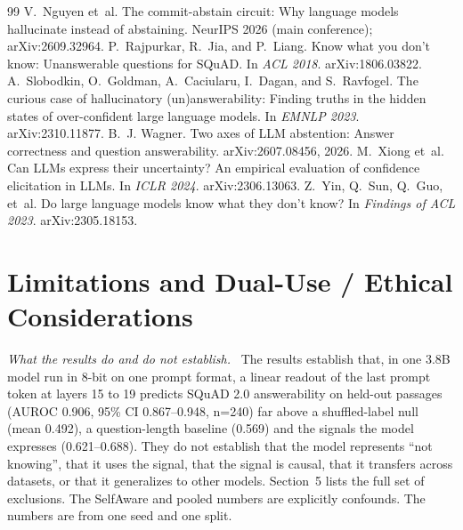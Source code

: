 \documentclass[10pt]{article}
\renewcommand{\paragraph}[1]{\par\vspace{0.3em}\noindent\textit{#1}\ }
\begin{document}
\begin{thebibliography}{99}
 V.~Nguyen et~al. The commit-abstain circuit: Why language models hallucinate instead of abstaining. NeurIPS 2026 (main conference); arXiv:2609.32964.
 P.~Rajpurkar, R.~Jia, and P.~Liang. Know what you don't know: Unanswerable questions for SQuAD. In \emph{ACL 2018}. arXiv:1806.03822.
 A.~Slobodkin, O.~Goldman, A.~Caciularu, I.~Dagan, and S.~Ravfogel. The curious case of hallucinatory (un)answerability: Finding truths in the hidden states of over-confident large language models. In \emph{EMNLP 2023}. arXiv:2310.11877.
 B.~J. Wagner. Two axes of LLM abstention: Answer correctness and question answerability. arXiv:2607.08456, 2026.
 M.~Xiong et~al. Can LLMs express their uncertainty? An empirical evaluation of confidence elicitation in LLMs. In \emph{ICLR 2024}. arXiv:2306.13063.
 Z.~Yin, Q.~Sun, Q.~Guo, et~al. Do large language models know what they don't know? In \emph{Findings of ACL 2023}. arXiv:2305.18153.
\end{thebibliography}

\clearpage
\appendix
\section{Limitations and Dual-Use / Ethical Considerations}\label{app:ethics}
\paragraph{What the results do and do not establish.}
The results establish that, in one 3.8B model run in 8-bit on one prompt format, a linear readout of the last prompt token at layers 15 to 19 predicts SQuAD 2.0 answerability on held-out passages (AUROC 0.906, 95\% CI 0.867--0.948, n=240) far above a shuffled-label null (mean 0.492), a question-length baseline (0.569) and the signals the model expresses (0.621--0.688). They do not establish that the model represents ``not knowing'', that it uses the signal, that the signal is causal, that it transfers across datasets, or that it generalizes to other models. Section~5 lists the full set of exclusions. The SelfAware and pooled numbers are explicitly confounds. The numbers are from one seed and one split.
\end{document}
